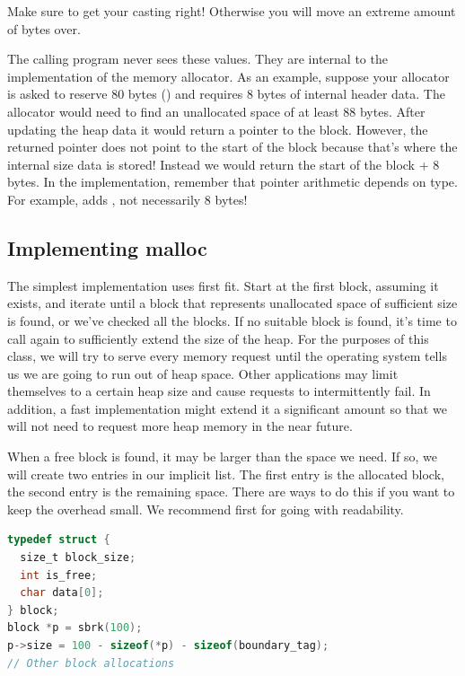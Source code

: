 Make sure to get your casting right!
Otherwise you will move an extreme amount of bytes over.

The calling program never sees these values.
They are internal to the implementation of the memory allocator.
As an example, suppose your allocator is asked to reserve 80 bytes () and requires 8 bytes of internal header data.
The allocator would need to find an unallocated space of at least 88 bytes.
After updating the heap data it would return a pointer to the block.
However, the returned pointer does not point to the start of the block because that's where the internal size data is stored!
Instead we would return the start of the block + 8 bytes.
In the implementation, remember that pointer arithmetic depends on type. For example,  adds , not necessarily 8 bytes!

\subsection{Implementing malloc}

The simplest implementation uses first fit.
Start at the first block, assuming it exists, and iterate until a block that represents unallocated space of sufficient size is found, or we've checked all the blocks.
If no suitable block is found, it's time to call  again to sufficiently extend the size of the heap.
For the purposes of this class, we will try to serve every memory request until the operating system tells us we are going to run out of heap space.
Other applications may limit themselves to a certain heap size and cause requests to intermittently fail.
In addition, a fast implementation might extend it a significant amount so that we will not need to request more heap memory in the near future.

When a free block is found, it may be larger than the space we need.
If so, we will create two entries in our implicit list.
The first entry is the allocated block, the second entry is the remaining space.
There are ways to do this if you want to keep the overhead small.
We recommend first for going with readability.

\begin{lstlisting}[language=C]
typedef struct {
  size_t block_size;
  int is_free;
  char data[0];
} block;
block *p = sbrk(100);
p->size = 100 - sizeof(*p) - sizeof(boundary_tag);
// Other block allocations
\end{lstlisting}

